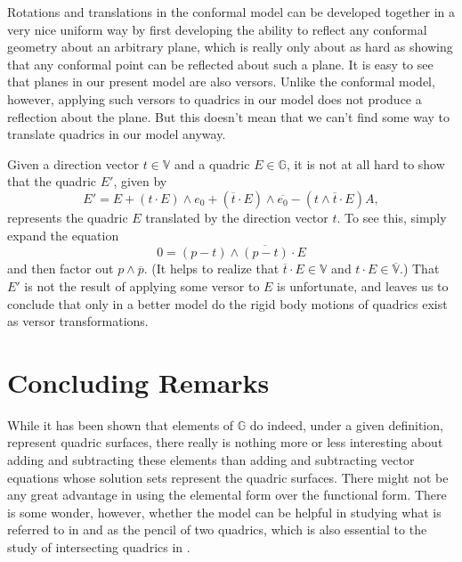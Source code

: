 \documentclass{birkjour}
\theoremstyle{definition}
\theoremstyle{remark}
\numberwithin{equation}{section}
\newcommand{\G}{\mathbb{G}}
\newcommand{\V}{\mathbb{V}}
\newcommand{\Alpha}{A}
\begin{document}
Rotations and translations in the conformal model can be developed together in
a very nice uniform way by first developing the ability to reflect any conformal
geometry about an arbitrary plane, which is really only about as hard as showing
that any conformal point can be reflected about such a plane.
It is easy to see that planes in our present model are also versors.  Unlike the conformal
model, however, applying such versors to quadrics in our model does not
produce a reflection about the plane.  But this doesn't mean that we can't
find some way to translate quadrics in our model anyway.

Given a direction vector $t\in\V$ and a quadric $E\in\G$, it is not at all hard
to show that the quadric $E'$, given by
\begin{equation}\label{equ_translate_quadric}
E' = E + (t\cdot E)\wedge e_0 + (\overline{t}\cdot E)\wedge\overline{e_0}
- (t\wedge\overline{t}\cdot E)\Alpha,
\end{equation}
represents the quadric $E$ translated by the direction vector $t$.  To see this,
simply expand the equation
\begin{equation}
0 = (p-t)\wedge\overline{(p-t)}\cdot E
\end{equation}
and then factor out $p\wedge\overline{p}$.
(It helps to realize that $\overline{t}\cdot E\in\V$ and $t\cdot E\in\overline{\V}$.)
That $E'$ is not the result of applying some versor to $E$ is unfortunate, and leaves
us to conclude that only in a better model do the rigid body motions of quadrics exist
as versor transformations.

\section{Concluding Remarks}

While it has been shown that elements of $\G$ do indeed, under a given
definition, represent quadric surfaces, there really is nothing more or less
interesting about adding and subtracting these elements than adding and
subtracting vector equations whose solution sets represent the quadric surfaces.
There might not be any great advantage in using the elemental form over the
functional form.  There is some wonder, however, whether the model can
be helpful in studying what is referred to in \cite{Miller87}
and \cite{ZhiqiangXu05} as the pencil of two quadrics, which is also essential
to the study of intersecting quadrics in \cite{Levin76}.
\end{document}
